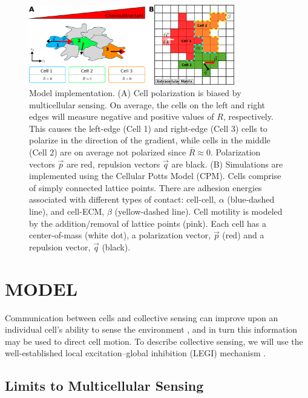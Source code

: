 \begin{figure}
    \centering
        \includegraphics[width=0.80\textwidth]{../fig/ch4_fig1.png}
    \caption{Model implementation. (A) Cell polarization is biased by multicellular sensing. On average, the cells on the left and right edges will measure negative and positive values of $R$, respectively. This causes the left-edge (Cell 1) and right-edge (Cell 3) cells to polarize in the direction of the gradient, while cells in the middle (Cell 2) are on average not polarized since $\bar{R} \approx 0$. Polarization vectors $\vec{p}$ are red, repulsion vectors $\vec{q}$ are black. (B) Simulations are implemented using the Cellular Potts Model (CPM). Cells comprise of simply connected lattice points. There are adhesion energies associated with different types of contact: cell-cell, $\alpha$ (blue-dashed line), and cell-ECM, $\beta$ (yellow-dashed line). Cell motility is modeled by the addition/removal of lattice points (pink). Each cell has a center-of-mass (white dot), a polarization vector, $\vec{p}$ (red) and a repulsion vector, $\vec{q}$ (black).} \label{fig:model}
\end{figure}


\section{MODEL}

Communication between cells and collective sensing can improve upon an individual cell's ability to sense the environment \cite{ellison2016cell}, and in turn this information may be used to direct cell motion. To describe collective sensing, we will use the well-established local excitation--global inhibition (LEGI) mechanism \cite{mugler2016limits,levchenko2002models}.

\subsection{Limits to Multicellular Sensing}

